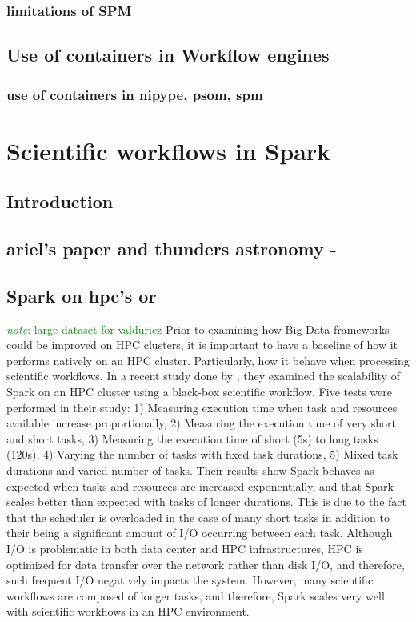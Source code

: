 \documentclass{report}
\newcommand{\note}[1]{\textcolor{green}{\textit{note}: #1}}
\begin{document}
		\subsection{limitations of SPM}
	\section{Use of containers in Workflow engines}
		\subsection{use of containers in nipype, psom, spm}
\chapter{Scientific workflows in Spark}
	\section{Introduction}
	\section{ariel's paper and thunders astronomy - }
	\section{Spark on hpc's or }
	\note{large dataset for valduriez}
	Prior to examining how Big Data frameworks could be improved on HPC clusters, it is important to have a baseline of how it performs natively on an HPC cluster. Particularly, how it behave when processing scientific workflows. In a recent study done by \cite{valduriez}, they examined the scalability of Spark on an HPC cluster using a black-box scientific workflow. Five tests were performed in their study: 1) Measuring execution time when task and resources available increase proportionally, 2) Measuring the execution time of very short and short tasks, 3) Measuring the execution time of short (5s) to long tasks (120s), 4) Varying the number of tasks with fixed task durations, 5) Mixed task durations and varied number of tasks. Their results show Spark behaves as expected when tasks and resources are increased exponentially, and that Spark scales better than expected with tasks of longer durations. This is due to the fact that the scheduler is overloaded in the case of many short tasks in addition to their being a significant amount of I/O occurring between each task. Although I/O is problematic in both data center and HPC infrastructures, HPC is optimized for data transfer over the network rather than disk I/O, and therefore, such frequent I/O negatively impacts the system. However, many scientific workflows are composed of longer tasks, and therefore, Spark scales very well with scientific workflows in an HPC environment.
\end{document}
